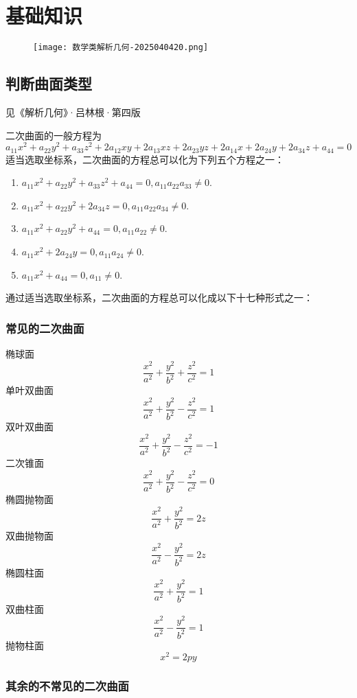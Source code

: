 \section{基础知识}

\begin{figure}[H]
\centering
\texttt{[image: 数学类解析几何-2025040420.png]}
\label{}
\end{figure}

\subsection{判断曲面类型}

见《解析几何》·吕林根·第四版

二次曲面的一般方程为
\[
a_{11}x^2+a_{22}y^2+a_{33}z^2+2a_{12}xy+2a_{13}xz+2a_{23}yz+2a_{14}x+2a_{24}y+2a_{34}z+a_{44}=0
\]
适当选取坐标系，二次曲面的方程总可以化为下列五个方程之一：

\begin{enumerate}
	\item $a_{11}x^2+a_{22}y^2+a_{33}z^2+a_{44}=0,a_{11}a_{22}a_{33}\neq0$.
	\item $a_{11}x^2+a_{22}y^2+2a_{34}z=0,a_{11}a_{22}a_{34}\neq0$.
	\item $a_{11}x^2+a_{22}y^2+a_{44}=0,a_{11}a_{22}\neq0$.
	\item $a_{11}x^2+2a_{24}y=0,a_{11}a_{24}\neq0$.
	\item $a_{11}x^2+a_{44}=0,a_{11}\neq0$.
\end{enumerate}

通过适当选取坐标系，二次曲面的方程总可以化成以下十七种形式之一：

\subsubsection{常见的二次曲面}

椭球面
\[
\frac{x^2}{a^2}+\frac{y^2}{b^2}+\frac{z^2}{c^2}=1
\]
单叶双曲面
\[
\frac{x^2}{a^2}+\frac{y^2}{b^2}-\frac{z^2}{c^2}=1
\]
双叶双曲面
\[
\frac{x^2}{a^2}+\frac{y^2}{b^2}-\frac{z^2}{c^2}=-1
\]
二次锥面
\[
\frac{x^2}{a^2}+\frac{y^2}{b^2}-\frac{z^2}{c^2}=0
\]
椭圆抛物面
\[
\frac{x^2}{a^2}+\frac{y^2}{b^2}=2z
\]
双曲抛物面
\[
\frac{x^2}{a^2}-\frac{y^2}{b^2}=2z
\]
椭圆柱面
\[
\frac{x^2}{a^2}+\frac{y^2}{b^2}=1
\]
双曲柱面
\[
\frac{x^2}{a^2}-\frac{y^2}{b^2}=1
\]
抛物柱面
\[
x^2=2py
\]
\subsubsection{其余的不常见的二次曲面}

